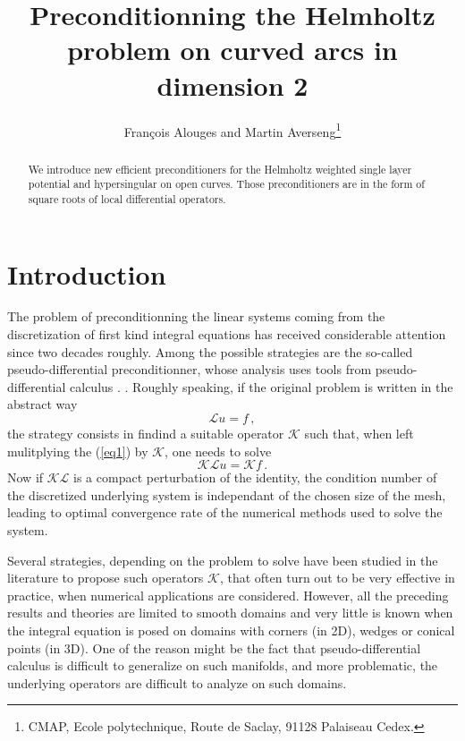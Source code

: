 \documentclass[a4paper]{article}
\title{Preconditionning the Helmholtz problem on curved arcs in dimension 2}
\author{Fran\c{c}ois Alouges and Martin Averseng\footnote{CMAP, Ecole polytechnique, Route de Saclay, 91128 Palaiseau Cedex.}}
\begin{document}
\maketitle

\begin{abstract}
	We introduce new efficient preconditioners for the Helmholtz weighted single layer potential and hypersingular on open curves. Those preconditioners are in the form of square roots of local differential operators. 
\end{abstract}

\section*{Introduction}

The problem of preconditionning the linear systems coming from the discretization of first kind integral equations has received considerable attention since two decades roughly. Among the possible strategies are the so-called 
pseudo-differential preconditionner, whose analysis uses tools from pseudo-differential calculus \cite{christiansen2002preconditioner,levadoux2005proposition,antoine2007generalized,mclean1997preconditioning}. . Roughly speaking, if the original problem is written in the abstract way
\begin{equation}
	\mathcal{L}u=f\,,
	\label{eq1}
\end{equation}
the strategy consists in findind a suitable operator $\mathcal{K}$ such
that, when left mulitplying the (\ref{eq1}) by $\mathcal{K}$, one needs to solve
\begin{equation}
	\mathcal{K}\mathcal{L}u=\mathcal{K}f\,.	
\end{equation}
Now if $\mathcal{K}\mathcal{L}$ is a compact perturbation of the identity, the condition number of the discretized underlying
system is independant of the chosen size of the mesh, leading to optimal convergence rate of the numerical methods used to solve the system.

Several strategies, depending on the problem to solve have been studied in the literature \cite{}  to propose such operators $\mathcal{K}$, that often turn out to be very effective in practice, when numerical applications are considered.
However, all the preceding results and theories are limited to smooth domains and very little is known when the integral equation 
is posed on domains with corners (in 2D), wedges or conical points (in 3D). One of the reason might be the fact that 
pseudo-differential calculus is difficult to generalize on such manifolds, and more problematic, the underlying operators
are difficult to analyze on such domains.
\end{document}

